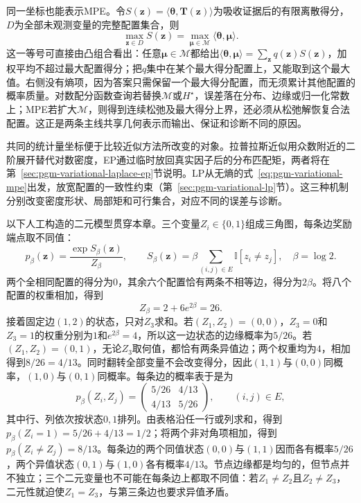 同一坐标也能表示MPE。令$S(\bm z)=\langle\bm{\theta},\bm T(\bm z)\rangle$为吸收证据后的有限离散得分，$D$为全部未观测变量的完整配置集合，则
\begin{equation}
  \max_{\bm z\in D}S(\bm z)
    =\max_{\bm{\mu}\in\mathcal M}
       \langle\bm{\theta},\bm{\mu}\rangle.
  \label{eq:pgm-variational-mpe}
\end{equation}
这一等号可直接由凸组合看出：任意$\bm\mu\in\mathcal M$都给出$\langle\bm\theta,\bm\mu\rangle=\sum_{\bm z}q(\bm z)S(\bm z)$，加权平均不超过最大配置得分；把$q$集中在某个最大得分配置上，又能取到这个最大值。右侧没有熵项，因为答案只需保留一个最大得分配置，而无须累计其他配置的概率质量。对数配分函数查询若替换$\mathcal M$或$H^\star$，误差落在分布、边缘或归一化常数上；MPE若扩大$\mathcal M$，则得到连续松弛及最大得分上界，还必须从松弛解恢复合法配置。这正是两条主线共享几何表示而输出、保证和诊断不同的原因。

共同的统计量坐标便于比较近似方法所改变的对象。拉普拉斯近似用众数附近的二阶展开替代对数密度，EP通过临时放回真实因子后的分布匹配矩，两者将在第~\ref{sec:pgm-variational-laplace-ep}节说明。LP从无熵的式~\eqref{eq:pgm-variational-mpe}出发，放宽配置的一致性约束（第~\ref{sec:pgm-variational-lp}节）。这三种机制分别改变密度形状、局部矩和可行集合，对应不同的误差与诊断。

\begin{example}[三角图的精确基准]
  \label{ex:pgm-variational-triangle}
  以下人工构造的二元模型贯穿本章。三个变量$Z_i\in\{0,1\}$组成三角图，每条边奖励端点取不同值：
  \begin{equation}
    p_\beta(\bm{z})=\frac{\exp S_\beta(\bm{z})}{Z_\beta},
    \qquad
    S_\beta(\bm{z})
      =\beta\sum_{(i,j)\in E}\mathbb I[z_i\ne z_j],
    \quad \beta=\log2.
    \label{eq:pgm-variational-triangle}
  \end{equation}
  两个全相同配置的得分为$0$，其余六个配置恰有两条不相等边，得分为$2\beta$。将八个配置的权重相加，得到
  \[
    Z_\beta=2+6e^{2\beta}=26.
  \]
  接着固定边$(1,2)$的状态，只对$Z_3$求和。若$(Z_1,Z_2)=(0,0)$，$Z_3=0$和$Z_3=1$的权重分别为$1$和$e^{2\beta}=4$，所以这一边状态的边缘概率为$5/26$。若$(Z_1,Z_2)=(0,1)$，无论$Z_3$取何值，都恰有两条异值边；两个权重均为$4$，相加得到$8/26=4/13$。同时翻转全部变量不会改变得分，因此$(1,1)$与$(0,0)$同概率，$(1,0)$与$(0,1)$同概率。每条边的概率表于是为
  \[
    p_\beta(Z_i,Z_j)=
      \begin{pmatrix}5/26&4/13\\4/13&5/26\end{pmatrix},
      \qquad (i,j)\in E,
  \]
  其中行、列依次按状态$0,1$排列。由表格沿任一行或列求和，得到$p_\beta(Z_i=1)=5/26+4/13=1/2$；将两个非对角项相加，得到$p_\beta(Z_i\ne Z_j)=8/13$。每条边的两个同值状态$(0,0)$与$(1,1)$因而各有概率$5/26$，两个异值状态$(0,1)$与$(1,0)$各有概率$4/13$。节点边缘都是均匀的，但节点并不独立；三个二元变量也不可能在每条边上都取不同值：若$Z_1\ne Z_2$且$Z_2\ne Z_3$，二元性就迫使$Z_1=Z_3$，与第三条边也要求异值矛盾。
\end{example}

